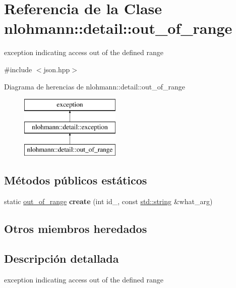 \hypertarget{classnlohmann_1_1detail_1_1out__of__range}{}\section{Referencia de la Clase nlohmann\+:\+:detail\+:\+:out\+\_\+of\+\_\+range}
\label{classnlohmann_1_1detail_1_1out__of__range}


exception indicating access out of the defined range  




{\ttfamily \#include $<$json.\+hpp$>$}

Diagrama de herencias de nlohmann\+:\+:detail\+:\+:out\+\_\+of\+\_\+range\begin{figure}[H]
\begin{center}
\leavevmode
\includegraphics[height=3.000000cm]{classnlohmann_1_1detail_1_1out__of__range}
\end{center}
\end{figure}
\subsection*{Métodos públicos estáticos}
\begin{DoxyCompactItemize}
\item 
\mbox{\label{classnlohmann_1_1detail_1_1out__of__range_a3f6d82a6f967c4728a1ec735a7867073}} 
static \mbox{\hyperlink{classnlohmann_1_1detail_1_1out__of__range}{out\+\_\+of\+\_\+range}} {\bfseries create} (int id\+\_\+, const \mbox{\hyperlink{namespacenlohmann_1_1detail_a1ed8fc6239da25abcaf681d30ace4985ab45cffe084dd3d20d928bee85e7b0f21}{std\+::string}} \&what\+\_\+arg)
\end{DoxyCompactItemize}
\subsection*{Otros miembros heredados}


\subsection{Descripción detallada}
exception indicating access out of the defined range 

